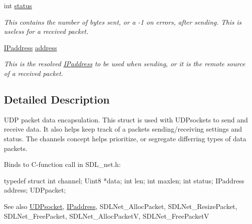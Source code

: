 \begin{DoxyCompactItemize}
int \hyperlink{struct_tao_1_1_sdl_1_1_sdl_net_1_1_u_d_ppacket_af69fefcaf40ff9f6d00a13558c014c6b}{status}
\begin{DoxyCompactList}\small\item\em This contains the number of bytes sent, or a -\/1 on errors, after sending. This is useless for a received packet. \item\end{DoxyCompactList}\item 
\hyperlink{struct_tao_1_1_sdl_1_1_sdl_net_1_1_i_paddress}{IPaddress} \hyperlink{struct_tao_1_1_sdl_1_1_sdl_net_1_1_u_d_ppacket_ad8f7cf3905cad9fafa81c9137cf4b813}{address}
\begin{DoxyCompactList}\small\item\em This is the resolved \hyperlink{struct_tao_1_1_sdl_1_1_sdl_net_1_1_i_paddress}{IPaddress} to be used when sending, or it is the remote source of a received packet. \item\end{DoxyCompactList}\end{DoxyCompactItemize}


\subsection{Detailed Description}
UDP packet data encapsulation. This struct is used with UDPsockets to send and receive data. It also helps keep track of a packets sending/receiving settings and status. The channels concept helps prioritize, or segregate differring types of data packets. 

Binds to C-\/function call in SDL\_\-net.h: 
\begin{DoxyCode}
                    typedef struct {
                        int channel;
                        Uint8 *data;
                        int len;
                        int maxlen;
                        int status;
                        IPaddress address;
                    } UDPpacket;
\end{DoxyCode}
 

\begin{DoxySeeAlso}{See also}
\hyperlink{struct_tao_1_1_sdl_1_1_sdl_net_1_1_u_d_psocket}{UDPsocket}, \hyperlink{struct_tao_1_1_sdl_1_1_sdl_net_1_1_i_paddress}{IPaddress}, SDLNet\_\-AllocPacket, SDLNet\_\-ResizePacket, SDLNet\_\-FreePacket, SDLNet\_\-AllocPacketV, SDLNet\_\-FreePacketV


\end{DoxySeeAlso}


